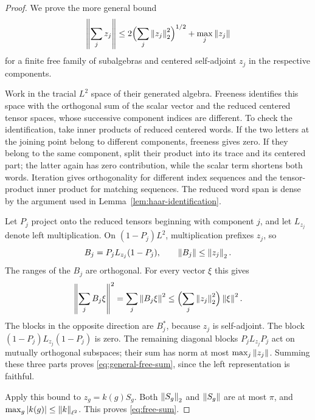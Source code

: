 \begin{proof}
We prove the more general bound
\begin{equation}\label{eq:general-free-sum}
 \left\lVert \sum_j z_j\right\rVert
 \leq 2\Bigl(\sum_j\left\lVert z_j\right\rVert_2^2\Bigr)^{1/2}
       +\max_j\left\lVert z_j\right\rVert
\end{equation}
for a finite free family of subalgebras and centered self-adjoint $z_j$ in the respective components.

Work in the tracial $L^2$ space of their generated algebra. Freeness identifies this space with the orthogonal sum of the scalar vector and the reduced centered tensor spaces, whose successive component indices are different. To check the identification, take inner products of reduced centered words. If the two letters at the joining point belong to different components, freeness gives zero. If they belong to the same component, split their product into its trace and its centered part; the latter again has zero contribution, while the scalar term shortens both words. Iteration gives orthogonality for different index sequences and the tensor-product inner product for matching sequences. The reduced word span is dense by the argument used in Lemma~\ref{lem:haar-identification}.

Let $P_j$ project onto the reduced tensors beginning with component $j$, and let $L_{z_j}$ denote left multiplication. On $(1-P_j)L^2$, multiplication prefixes $z_j$, so
\[
 B_j=P_jL_{z_j}(1-P_j),\qquad \left\lVert B_j\right\rVert\leq\left\lVert z_j\right\rVert_2.
\]
The ranges of the $B_j$ are orthogonal. For every vector $\xi$ this gives
\[
 \left\lVert \sum_jB_j\xi\right\rVert^2
   =\sum_j\left\lVert B_j\xi\right\rVert^2
   \leq\Bigl(\sum_j\left\lVert z_j\right\rVert_2^2\Bigr)\left\lVert \xi\right\rVert^2.
\]
The blocks in the opposite direction are $B_j^*$, because $z_j$ is self-adjoint. The block $(1-P_j)L_{z_j}(1-P_j)$ is zero. The remaining diagonal blocks $P_jL_{z_j}P_j$ act on mutually orthogonal subspaces; their sum has norm at most $\max_j\left\lVert z_j\right\rVert$. Summing these three parts proves \eqref{eq:general-free-sum}, since the left representation is faithful.

Apply this bound to $z_g=k(g)S_g$. Both $\left\lVert S_g\right\rVert_2$ and $\left\lVert S_g\right\rVert$ are at most $\pi$, and $\max_g\left\lvert k(g)\right\rvert\leq\left\lVert k\right\rVert_{\ell^2}$. This proves \eqref{eq:free-sum}.
\end{proof}
